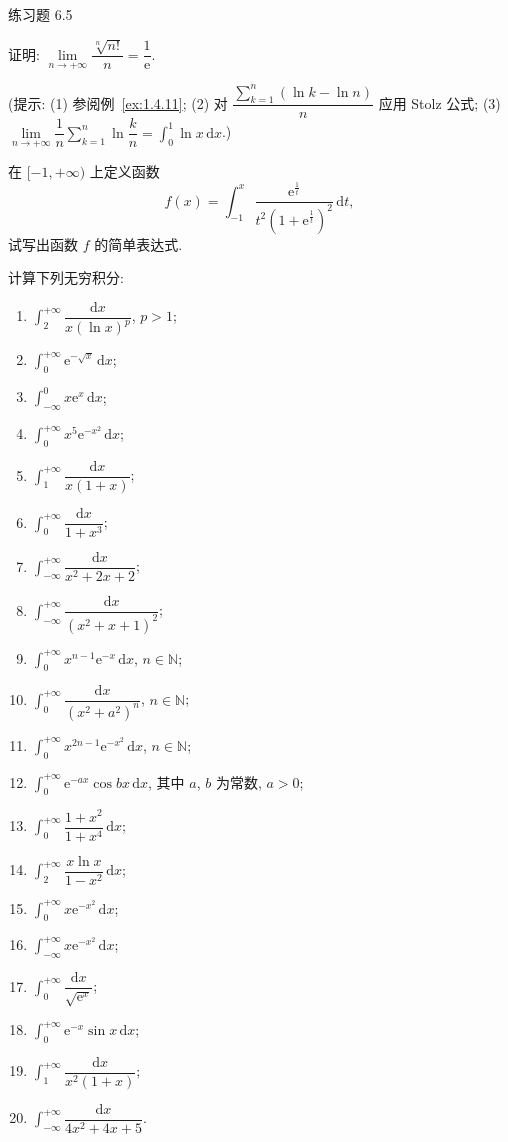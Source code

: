 \begin{exblock}{练习题 6.5}

  \item 证明: $\lim\limits_{n\to+\infty}\dfrac{\sqrt[n]{n!}}{n}=\dfrac{1}{\mathrm{e}}$.

  (提示: (1) 参阅例~\ref{ex:1.4.11}; (2) 对 $\dfrac{\sum\limits_{k=1}^{n}(\ln k-\ln n)}{n}$ 应用 Stolz 公式; (3) $\lim\limits_{n\to+\infty}\dfrac{1}{n}\sum\limits_{k=1}^{n}\ln\dfrac{k}{n}=\int_{0}^{1}\ln x\,\mathrm{d}x$.)

  \item 在 $[-1,+\infty)$ 上定义函数
  \[
  f(x)=\int_{-1}^{x}\frac{\mathrm{e}^{\frac{1}{t}}}{t^{2}\left(1+\mathrm{e}^{\frac{1}{t}}\right)^{2}}\,\mathrm{d}t,
\]
  试写出函数 $f$ 的简单表达式.

  \item 计算下列无穷积分:
  \begin{enumerate}[label=(\arabic*)]
    \item $\int_{2}^{+\infty}\dfrac{\mathrm{d}x}{x(\ln x)^{p}}$, $p>1$;
    \item $\int_{0}^{+\infty}\mathrm{e}^{-\sqrt{x}}\,\mathrm{d}x$;
    \item $\int_{-\infty}^{0}x\mathrm{e}^{x}\,\mathrm{d}x$;
    \item $\int_{0}^{+\infty}x^{5}\mathrm{e}^{-x^{2}}\,\mathrm{d}x$;
    \item $\int_{1}^{+\infty}\dfrac{\mathrm{d}x}{x(1+x)}$;
    \item $\int_{0}^{+\infty}\dfrac{\mathrm{d}x}{1+x^{3}}$;
    \item $\int_{-\infty}^{+\infty}\dfrac{\mathrm{d}x}{x^{2}+2x+2}$;
    \item $\int_{-\infty}^{+\infty}\dfrac{\mathrm{d}x}{(x^{2}+x+1)^{2}}$;
    \item $\int_{0}^{+\infty}x^{n-1}\mathrm{e}^{-x}\,\mathrm{d}x$, $n\in\mathbb{N}$;
    \item $\int_{0}^{+\infty}\dfrac{\mathrm{d}x}{(x^{2}+a^{2})^{n}}$, $n\in\mathbb{N}$;
    \item $\int_{0}^{+\infty}x^{2n-1}\mathrm{e}^{-x^{2}}\,\mathrm{d}x$, $n\in\mathbb{N}$;
    \item $\int_{0}^{+\infty}\mathrm{e}^{-ax}\cos bx\,\mathrm{d}x$, 其中 $a$, $b$ 为常数, $a>0$;
    \item $\int_{0}^{+\infty}\dfrac{1+x^{2}}{1+x^{4}}\,\mathrm{d}x$;
    \item $\int_{2}^{+\infty}\dfrac{x\ln x}{1-x^{2}}\,\mathrm{d}x$;
    \item $\int_{0}^{+\infty}x\mathrm{e}^{-x^{2}}\,\mathrm{d}x$;
    \item $\int_{-\infty}^{+\infty}x\mathrm{e}^{-x^{2}}\,\mathrm{d}x$;
    \item $\int_{0}^{+\infty}\dfrac{\mathrm{d}x}{\sqrt{\mathrm{e}^{x}}}$;
    \item $\int_{0}^{+\infty}\mathrm{e}^{-x}\sin x\,\mathrm{d}x$;
    \item $\int_{1}^{+\infty}\dfrac{\mathrm{d}x}{x^{2}(1+x)}$;
    \item $\int_{-\infty}^{+\infty}\dfrac{\mathrm{d}x}{4x^{2}+4x+5}$.
  \end{enumerate}


\end{exblock}
